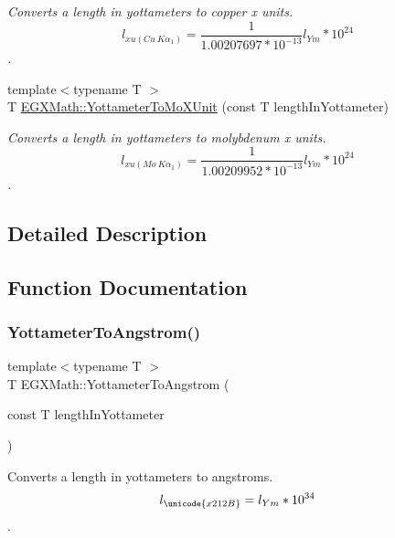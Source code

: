 \begin{DoxyCompactItemize}
\begin{DoxyCompactList}\small\item\em Converts a length in yottameters to copper x units. \[ l_{xu(Cu\ K\alpha_1)}= \frac{1}{1.00207697*10^{-13}} l_{Ym} * 10^{24}\]. \end{DoxyCompactList}\item 
{\footnotesize template$<$typename T $>$ }\\T \mbox{\hyperlink{group___e_g_x_math-_conversions-_length_conversions-_yottameter-_non-_s_i_ga545da9526f7a62f5ca7d1800faf17d1d}{E\+G\+X\+Math\+::\+Yottameter\+To\+Mo\+X\+Unit}} (const T length\+In\+Yottameter)
\begin{DoxyCompactList}\small\item\em Converts a length in yottameters to molybdenum x units. \[ l_{xu(Mo\ K\alpha_1)}=\frac{1}{1.00209952*10^{-13}} l_{Ym} * 10^{24}\]. \end{DoxyCompactList}\end{DoxyCompactItemize}


\subsection{Detailed Description}


\subsection{Function Documentation}
\mbox{\label{group___e_g_x_math-_conversions-_length_conversions-_yottameter-_non-_s_i_ga0129b788ceb2d7d4ce86c155ee9d4675}} 
\subsubsection{\texorpdfstring{Yottameter\+To\+Angstrom()}{YottameterToAngstrom()}}
{\footnotesize\ttfamily template$<$typename T $>$ \\
T E\+G\+X\+Math\+::\+Yottameter\+To\+Angstrom (\begin{DoxyParamCaption}\item[{const T}]{length\+In\+Yottameter }\end{DoxyParamCaption})}



Converts a length in yottameters to angstroms. \[ l_{\unicode{x212B}}=l_{Ym} * 10^{34} \]. 

